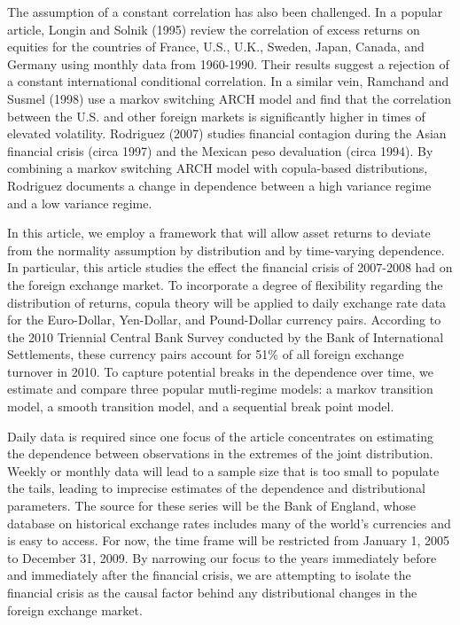 \documentclass[12pt]{article}
\begin{document}
The assumption of a constant correlation has also been challenged. In a
popular article, Longin and Solnik (1995) review the correlation of excess
returns on equities for the countries of France, U.S., U.K., Sweden, Japan,
Canada, and Germany using monthly data from 1960-1990. Their results suggest
a rejection of a constant international conditional correlation. In a similar
vein, Ramchand and Susmel (1998) use a markov switching ARCH model and find
that the correlation between the U.S. and other foreign markets is
significantly higher in times of elevated volatility. Rodriguez (2007) studies
financial contagion during the Asian financial crisis (circa 1997) and the
Mexican peso devaluation (circa 1994). By combining a markov switching ARCH
model with copula-based distributions, Rodriguez documents a change in
dependence between a high variance regime and a low variance regime.

In this article, we employ a framework that will allow asset returns to
deviate from the normality assumption by distribution and by time-varying
dependence. In particular, this article studies the effect the financial
crisis of 2007-2008 had on the foreign exchange market. To incorporate a
degree of flexibility regarding the distribution of returns, copula theory
will be applied to daily exchange rate data for the Euro-Dollar, Yen-Dollar,
and Pound-Dollar currency pairs. According to the 2010 Triennial Central
Bank Survey conducted by the Bank of International Settlements, these
currency pairs account for 51\% of all foreign exchange turnover in 2010.
To capture potential breaks in the dependence over time, we estimate and
compare three popular mutli-regime models: a markov transition model, a
smooth transition model, and a sequential break point model.

Daily data is required since one focus of the article concentrates on
estimating the dependence between observations in the extremes of the joint
distribution. Weekly or monthly data will lead to a sample size that is too
small to populate the tails, leading to imprecise estimates of the dependence
and distributional parameters. The source for these series will be the
Bank of England, whose database on historical exchange rates includes many
of the world's currencies and is easy to access. For now, the time frame
will be restricted from January 1, 2005 to December 31, 2009. By narrowing
our focus to the years immediately before and immediately after the financial
crisis, we are attempting to isolate the financial crisis as the causal
factor behind any distributional changes in the foreign exchange market.
\end{document}
